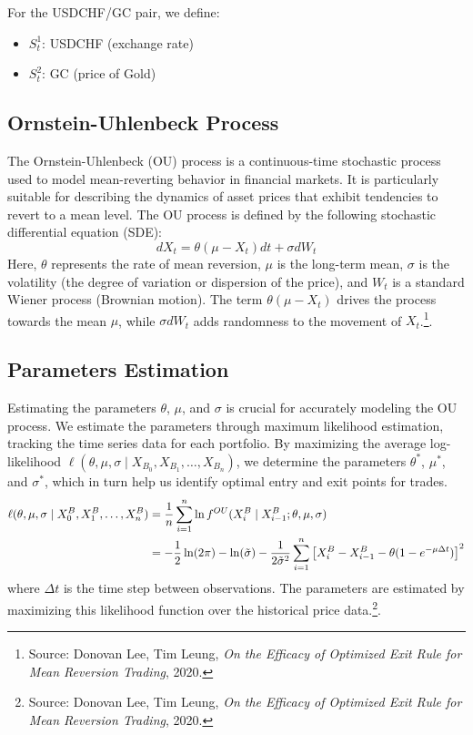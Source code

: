 \documentclass{article}
\begin{document}
For the USDCHF/GC pair, we define:
\begin{itemize}
    \item $S_t^1$: USDCHF (exchange rate)
    \item $S_t^2$: GC (price of Gold)
\end{itemize}

\subsection*{Ornstein-Uhlenbeck Process}
The Ornstein-Uhlenbeck (OU) process is a continuous-time stochastic process used to model mean-reverting behavior in financial markets. It is particularly suitable for describing the dynamics of asset prices that exhibit tendencies to revert to a mean level. The OU process is defined by the following stochastic differential equation (SDE):
\begin{equation}
dX_t = \theta (\mu - X_t) dt + \sigma dW_t
\end{equation}
Here, \( \theta \) represents the rate of mean reversion, \( \mu \) is the long-term mean, \( \sigma \) is the volatility (the degree of variation or dispersion of the price), and \( W_t \) is a standard Wiener process (Brownian motion). The term \( \theta (\mu - X_t) \) drives the process towards the mean \( \mu \), while \( \sigma dW_t \) adds randomness to the movement of \( X_t \).\footnote{Source: Donovan Lee, Tim Leung, \textit{On the Efficacy of Optimized Exit Rule for Mean Reversion Trading}, 2020.}.

\subsection*{Parameters Estimation}
Estimating the parameters \( \theta \), \( \mu \), and \( \sigma \) is crucial for accurately modeling the OU process. We estimate the parameters through maximum likelihood estimation, tracking the time series data for each portfolio. By maximizing the average log-likelihood $\ell(\theta, \mu, \sigma \mid X_{B_0}, X_{B_1}, \ldots, X_{B_n})$, we determine the parameters $\theta^*$, $\mu^*$, and $\sigma^*$, which in turn help us identify optimal entry and exit points for trades.
\begin{align}
\ell(\theta, \mu, \sigma \mid X_0^B, X_1^B, \ldots, X_n^B) &= \frac{1}{n} \sum_{i=1}^n \ln f^{OU}(X_i^B \mid X_{i-1}^B; \theta, \mu, \sigma) \notag \\
&= -\frac{1}{2} \ln(2\pi) - \ln(\tilde{\sigma}) - \frac{1}{2 \tilde{\sigma}^2} \sum_{i=1}^n \left[ X_i^B - X_{i-1}^B - \theta (1 - e^{-\mu \Delta t}) \right]^2
\end{align}
where \( \Delta t \) is the time step between observations. The parameters are estimated by maximizing this likelihood function over the historical price data.\footnote{Source: Donovan Lee, Tim Leung, \textit{On the Efficacy of Optimized Exit Rule for Mean Reversion Trading}, 2020.}.\\
\end{document}
